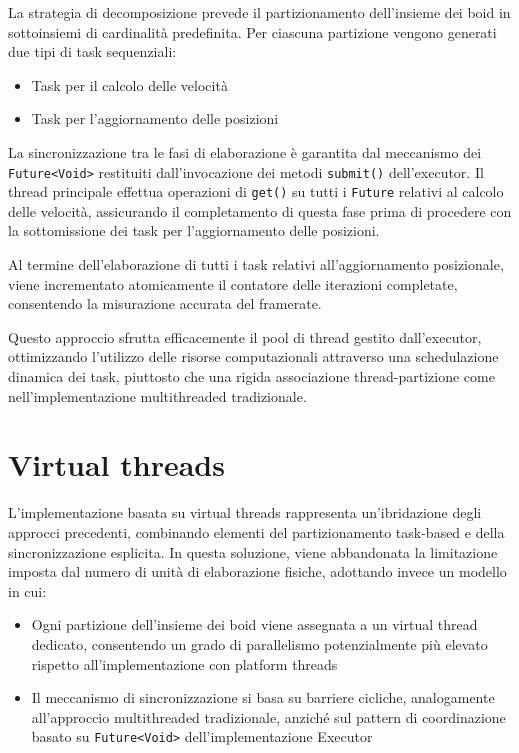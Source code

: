 \documentclass[a4paper,12pt]{report}
\begin{document}
La strategia di decomposizione prevede il partizionamento dell'insieme dei boid in sottoinsiemi di cardinalità predefinita. Per ciascuna partizione vengono generati due tipi di task sequenziali:
\begin{itemize}
    \item Task per il calcolo delle velocità
    \item Task per l'aggiornamento delle posizioni
\end{itemize}

La sincronizzazione tra le fasi di elaborazione è garantita dal meccanismo dei \texttt{Future<Void>} restituiti dall'invocazione dei metodi \texttt{submit()} dell'executor. Il thread principale effettua operazioni di \texttt{get()} su tutti i \texttt{Future} relativi al calcolo delle velocità, assicurando il completamento di questa fase prima di procedere con la sottomissione dei task per l'aggiornamento delle posizioni.

Al termine dell'elaborazione di tutti i task relativi all'aggiornamento posizionale, viene incrementato atomicamente il contatore delle iterazioni completate, consentendo la misurazione accurata del framerate.

Questo approccio sfrutta efficacemente il pool di thread gestito dall'executor, ottimizzando l'utilizzo delle risorse computazionali attraverso una schedulazione dinamica dei task, piuttosto che una rigida associazione thread-partizione come nell'implementazione multithreaded tradizionale.

\section{Virtual threads}
L'implementazione basata su virtual threads rappresenta un'ibridazione degli approcci precedenti, combinando elementi del partizionamento task-based e della sincronizzazione esplicita. In questa soluzione, viene abbandonata la limitazione imposta dal numero di unità di elaborazione fisiche, adottando invece un modello in cui:

\begin{itemize}
    \item Ogni partizione dell'insieme dei boid viene assegnata a un virtual thread dedicato, consentendo un grado di parallelismo potenzialmente più elevato rispetto all'implementazione con platform threads
    \item Il meccanismo di sincronizzazione si basa su barriere cicliche, analogamente all'approccio multithreaded tradizionale, anziché sul pattern di coordinazione basato su \texttt{Future<Void>} dell'implementazione Executor
\end{itemize}
\end{document}
